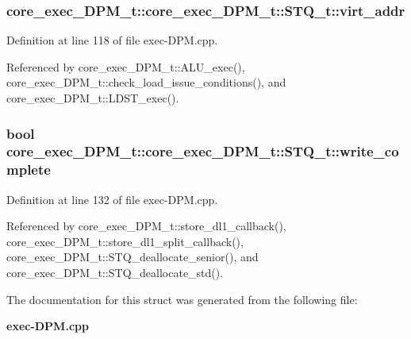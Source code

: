 \subsubsection[{virt\_\-addr}]{ core\_\-exec\_\-DPM\_\-t::core\_\-exec\_\-DPM\_\-t::STQ\_\-t::virt\_\-addr}\label{structcore__exec__DPM__t_1_1STQ__t_68434b699cc17dac41c332e7ebaf015a}




Definition at line 118 of file exec-DPM.cpp.

Referenced by core\_\-exec\_\-DPM\_\-t::ALU\_\-exec(), core\_\-exec\_\-DPM\_\-t::check\_\-load\_\-issue\_\-conditions(), and core\_\-exec\_\-DPM\_\-t::LDST\_\-exec().
\subsubsection[{write\_\-complete}]{\setlength{\rightskip}{0pt plus 5cm}bool core\_\-exec\_\-DPM\_\-t::core\_\-exec\_\-DPM\_\-t::STQ\_\-t::write\_\-complete}\label{structcore__exec__DPM__t_1_1STQ__t_b8a0d483ae23caa1cca70f2636c48109}




Definition at line 132 of file exec-DPM.cpp.

Referenced by core\_\-exec\_\-DPM\_\-t::store\_\-dl1\_\-callback(), core\_\-exec\_\-DPM\_\-t::store\_\-dl1\_\-split\_\-callback(), core\_\-exec\_\-DPM\_\-t::STQ\_\-deallocate\_\-senior(), and core\_\-exec\_\-DPM\_\-t::STQ\_\-deallocate\_\-std().

The documentation for this struct was generated from the following file:\begin{CompactItemize}
\item 
{\bf exec-DPM.cpp}\end{CompactItemize}
